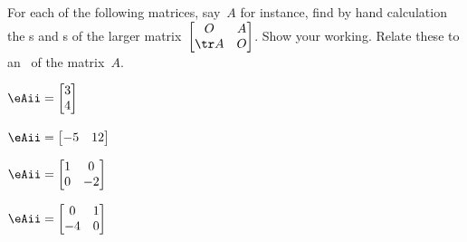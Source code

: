 \begin{exercise} \label{ex:} 
For each of the following matrices, say~\(A\) for instance, find by hand calculation the s and s of the larger matrix~\(\begin{bmatrix} O&A\\\tr A&O \end{bmatrix}\).
Show your working.
Relate these to an \svd\ of the matrix~\(A\).
\begin{parts}
\item \(\eAii=\begin{bmatrix} 3\\4 \end{bmatrix}\)

\item \(\eAii=\begin{bmatrix} -5&12 \end{bmatrix}\)

\item \(\eAii=\begin{bmatrix} 1&0\\0&-2 \end{bmatrix}\)

\item \(\eAii=\begin{bmatrix} 0&1\\-4&0 \end{bmatrix}\)

\end{parts}
\end{exercise}




